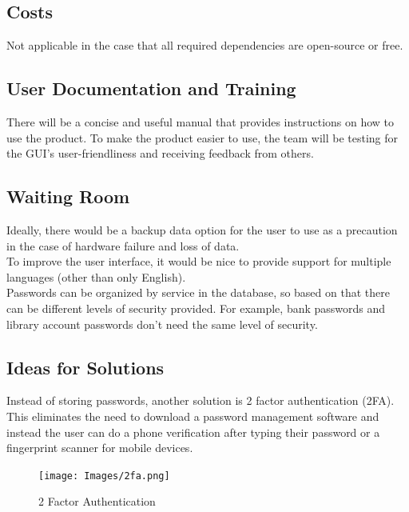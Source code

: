 \documentclass[12pt, titlepage]{article}
\begin{document}
\subsection{Costs}

Not applicable in the case that all required dependencies are open-source or free.

\subsection{User Documentation and Training}

There will be a concise and useful manual that provides instructions on how to use the product. To make the product easier to use, the team will be testing for the GUI’s user-friendliness and receiving feedback from others. 

\subsection{Waiting Room}

Ideally, there would be a backup data option for the user to use as a precaution in the case of hardware 
failure and loss of data.
\\
To improve the user interface, it would be nice to provide support for multiple languages (other than only English).
\\
Passwords can be organized by service in the database, so based on that there can be different levels of security provided. For example, bank passwords and library account passwords don’t need the same level of security.

\subsection{Ideas for Solutions}

Instead of storing passwords, another solution is 2 factor authentication (2FA). This eliminates the need to download a password management software and instead the user can do a phone verification after typing their password or a fingerprint scanner for mobile devices.

\begin{figure}[H]
\texttt{[image: Images/2fa.png]}
\caption{2 Factor Authentication \cite{FileCloudDefs} }
\end{figure}

\newpage



\end{document}
